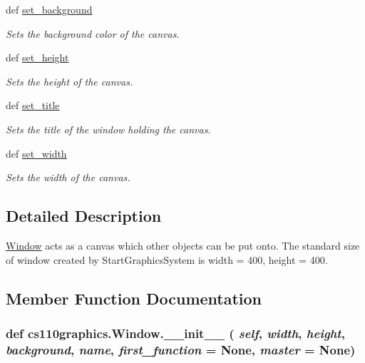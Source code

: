 \begin{DoxyCompactItemize}
def \hyperlink{classcs110graphics_1_1Window_a981a3115f1f22099549117313f38333c}{set\_\-background}
\begin{DoxyCompactList}\small\item\em Sets the background color of the canvas. \item\end{DoxyCompactList}\item 
def \hyperlink{classcs110graphics_1_1Window_a9b548549f8f09ca3f29e6e80483e21d2}{set\_\-height}
\begin{DoxyCompactList}\small\item\em Sets the height of the canvas. \item\end{DoxyCompactList}\item 
def \hyperlink{classcs110graphics_1_1Window_a227c806c2acbcaca9958ba3b610a85f6}{set\_\-title}
\begin{DoxyCompactList}\small\item\em Sets the title of the window holding the canvas. \item\end{DoxyCompactList}\item 
def \hyperlink{classcs110graphics_1_1Window_a55036373bfb4437eb4368a39fedb8722}{set\_\-width}
\begin{DoxyCompactList}\small\item\em Sets the width of the canvas. \item\end{DoxyCompactList}\end{DoxyCompactItemize}


\subsection{Detailed Description}
\hyperlink{classcs110graphics_1_1Window}{Window} acts as a canvas which other objects can be put onto. The standard size of window created by StartGraphicsSystem is width = 400, height = 400. 

\subsection{Member Function Documentation}
\hypertarget{classcs110graphics_1_1Window_af926549e3d731847886302fa390f2863}{
\subsubsection[{\_\-\_\-init\_\-\_\-}]{\setlength{\rightskip}{0pt plus 5cm}def cs110graphics.Window.\_\-\_\-init\_\-\_\- ( {\em self}, \/   {\em width}, \/   {\em height}, \/   {\em background}, \/   {\em name}, \/   {\em first\_\-function} = {\ttfamily None}, \/   {\em master} = {\ttfamily None})}}
\label{classcs110graphics_1_1Window_af926549e3d731847886302fa390f2863}

